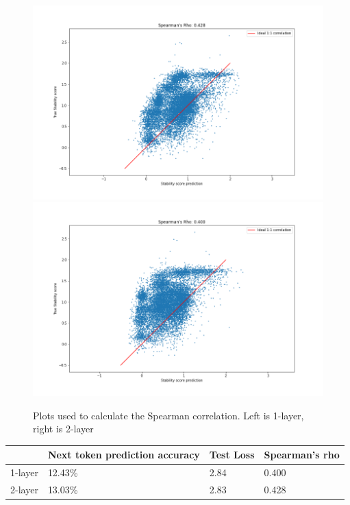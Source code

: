 \begin{figure}[!ht]
  \centering
  \includegraphics[width=0.4\linewidth]{latex/imgs/spearman_1_layer_with_schedule_512_final.png}
  \includegraphics[width=0.4\linewidth]{latex/imgs/spearman_2_layer_no_drop_final.png}
  \caption{Plots used to calculate the Spearman correlation. Left is 1-layer, right is 2-layer}
\end{figure}

\begin{table}[!ht]
\begin{tabular}{|l|l|l|l|}
\hline
        & Next token prediction accuracy & Test Loss & Spearman's rho\\ \hline
1-layer & 12.43\%                        & 2.84      & 0.400         \\ \hline
2-layer & 13.03\%                        & 2.83      & 0.428         \\ \hline
\end{tabular}
\end{table}
